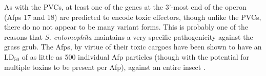 As with the PVCs, at least one of the genes at the 3'-most end of the operon (Afps 17 and 18) are predicted to encode toxic effectors, though unlike the PVCs, there do no not appear to be many variant forms. This is probably one of the reasons that \emph{S. entomophila} maintains a very specific pathogenicity against the grass grub. The Afps, by virtue of their toxic cargoes have been shown to have an LD$_{50}$ of as little as 500 individual Afp particles (though with the potential for multiple toxins to be present per Afp), against an entire insect \citep{Rybakova1994}.

\begin{figure}[p]
\centering
\tabskip=0pt
\end{figure}
